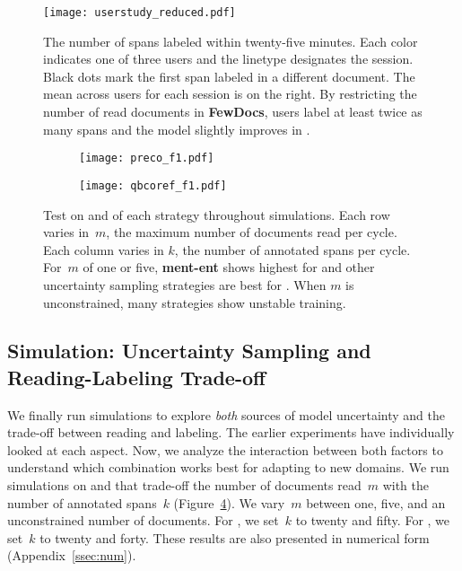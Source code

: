 \begin{figure}[!t]
\centering
\texttt{[image: userstudy\_reduced.pdf]}
\caption{The number of spans labeled within twenty-five minutes.
Each color indicates one of three users and the linetype
    designates the session.
Black dots mark the first span labeled in a different
    document. The mean \avgfone{} across users for each session is
    on the right. By restricting the number of read documents in
    \textbf{FewDocs}, users label at least twice as many spans and the model
    slightly
    improves in \avgfone{}. }
\label{fig:user}
\end{figure}


\begin{figure}[!t]
    \centering
    \begin{subfigure}[t]{\linewidth}
        \centering
        \texttt{[image: preco\_f1.pdf]}
        \caption{\preco{}}
        \label{fig:preco}
    \end{subfigure}
    \begin{subfigure}[t]{\linewidth}
        \centering
        \texttt{[image: qbcoref\_f1.pdf]}
        \caption{\qbcoref{}}
        \label{fig:qbcoref}
    \end{subfigure}
    \caption{Test \avgfone{} on \preco{} and \qbcoref{} of each strategy
    throughout simulations. Each row varies in~$m$, the maximum number of
    documents read per cycle. Each column varies in $k$, the number of annotated
    spans per cycle.
    For~$m$ of one or five, \textbf{ment-ent} shows highest \avgfone{}
    for \preco{} and other uncertainty sampling strategies are best for
    \qbcoref{}. When $m$ is unconstrained, many strategies show unstable
    training.
    }
    \label{fig:f1}
\end{figure}

\subsection{Simulation: Uncertainty Sampling and Reading-Labeling Trade-off}
\label{ssec:adaptation}

We finally run simulations to explore \textit{both} sources of model uncertainty and the
trade-off between reading and labeling. The earlier experiments have individually
looked at each aspect.
Now, we analyze the interaction between both factors to understand which
combination works best for adapting \coref{} to new domains.
We run simulations on \preco{} and \qbcoref{} that trade-off the number
of documents read~$m$ with the number of annotated spans~$k$
(Figure~\ref{fig:f1}).  We vary~$m$ between one, five, and an unconstrained number of documents.
For \preco{}, we set~$k$ to twenty and fifty.
For \qbcoref{}, we set~$k$ to twenty and forty.
These results are also presented in numerical form (Appendix~\ref{ssec:num}).


